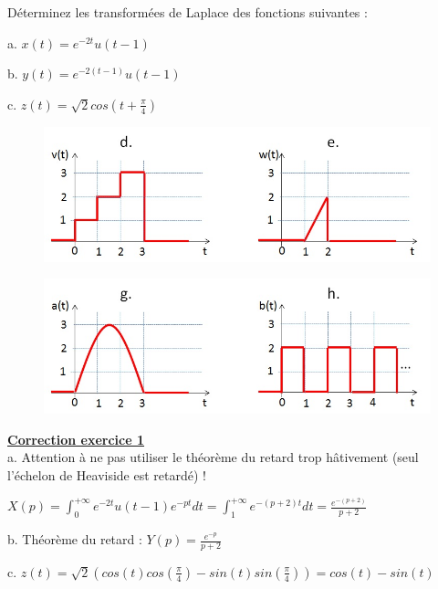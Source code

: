 \documentclass[11pt]{report}
\begin{document}
	Déterminez les transformées de Laplace des fonctions suivantes :
	
	a. $x(t)=e^{-2t}u(t-1)$
	
	b. $y(t)=e^{-2(t-1)}u(t-1)$
	
	c. $z(t) = \sqrt{2}cos(t+\frac{\pi}{4})$
	
	\begin{figure}[h!]
		\centering
		\includegraphics[scale=0.5]{images/Exo_2_1_a.jpg} 
	\end{figure} 

	\begin{figure}[h!]
		\centering
		\includegraphics[scale=0.5]{images/Exo_2_1_b.jpg} 
	\end{figure}
	
	
	
	\vspace{1\baselineskip}
	
	\textbf{\underline{Correction exercice 1}}\\
	a. Attention à ne pas utiliser le théorème du retard trop hâtivement (seul l'échelon de Heaviside est retardé) !
	
	$X(p) = \int_{0}^{+\infty} e^{-2t}u(t-1)e^{-pt}dt=\int_{1}^{+\infty} e^{-(p+2)t}dt=\frac{e^{-(p+2)}}{p+2}$
	
	\vspace{0.5\baselineskip}
	
	b. Théorème du retard : $Y(p) = \frac{e^{-p}}{p+2}$
	
	\vspace{0.5\baselineskip}
	
	c. $z(t) = \sqrt{2}(cos(t)cos(\frac{\pi}{4})-sin(t)sin(\frac{\pi}{4}))=cos(t)-sin(t)$
	
\end{document}
